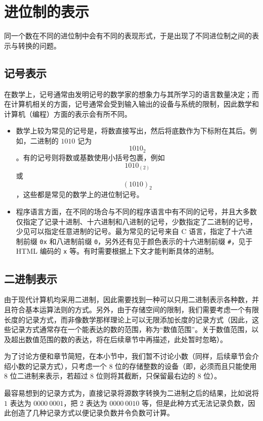 \section{进位制的表示}\label{sec:ArithBasics/positional-notation-presentation}
    同一个数在不同的进位制中会有不同的表现形式，于是出现了不同进位制之间的表示与转换的问题。
    \subsection{记号表示}\label{subsec:ArithBasics/positional-notation-presentation/natural}
        在数学上，记号通常由发明记号的数学家的想象力与其所学习的语言数量决定；而在计算机相关的方面，记号通常会受到输入输出的设备与系统的限制，因此数学和计算机（编程）方面的表示会有所不同。
        \begin{itemize}
            \item 数学上较为常见的记号是，将数直接写出，然后将底数作为下标附在其后。例如，二进制的 $1010$ 记为\[1010_2\]。有的记号则将数或基数使用小括号包裹，例如\[1010_{(2)}\]或\[(1010)_2\]，这些都是常见的数学上的进位制记号。
            \item 程序语言方面，在不同的场合与不同的程序语言中有不同的记号，并且大多数仅指定了记录十进制、十六进制和八进制的记号，少数指定了二进制的记号，少见可以指定任意进制的记号。最为常见的记号来自 C 语言，指定了十六进制前缀 \texttt{0x} 和八进制前缀 \texttt{0}，另外还有见于颜色表示的十六进制前缀 \texttt{\#}，见于 HTML 编码的 \texttt{x} 等。有时需要根据上下文才能判断具体的进制。
        \end{itemize}
    \subsection{二进制表示}\label{subsec:ArithBasics/positional-notation-presentation/binary}
        由于现代计算机均采用二进制，因此需要找到一种可以只用二进制表示各种数，并且符合基本运算法则的方式。另外，由于存储空间的限制，我们需要考虑一个有限长度的记录方式，而非像数学那样理论上可以无限添加长度的记录方式（因此，这些记录方式通常存在一个能表达的数的范围，称为“数值范围”。关于数值范围，以及超出数值范围的数的表达，将在后续章节中再描述，此处暂时忽略）。

        为了讨论方便和章节简短，在本小节中，我们暂不讨论小数（同样，后续章节会介绍小数的记录方式），只考虑一个 $8$ 位的存储整数的设备（即，必须而且只能使用 $8$ 位二进制来表示，若超过 $8$ 位则将其截断，只保留最右边的 $8$ 位）。

        最容易想到的记录方式为，直接记录将源数字转换为二进制之后的结果，比如说将 $1$ 表达为 $0000\ 0001$，把 $2$ 表达为 $0000\ 0010$ 等，但是此种方式无法记录负数，因此创造了几种记录方式以便记录负数并令负数可计算。

